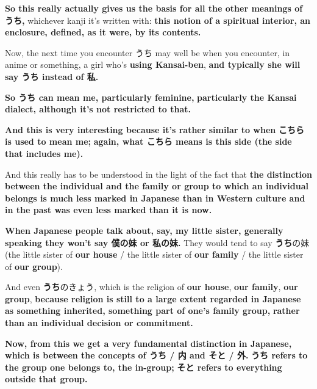 {}

{\bf So this really actually gives us the basis for all the other meanings of うち,} whichever kanji it's written with: {\bf this notion of a spiritual interior, an enclosure, defined, as it were, by its contents.}

\startsectionlevel[title={うち as meaning me / 私 etc.},reference={うち-as-meaning-me-私-etc.}]

Now, the next time you encounter うち may well be when you encounter, in anime or something, a girl who's {\bf using Kansai-ben}, {\bf and typically she will say うち instead of 私.}

{}

{\bf So うち can mean me, particularly feminine,} {\bf particularly the Kansai dialect, although it's not restricted to that.}

\thinrule

{\bf And this is very interesting because it's rather similar to when} {\bf こちら is used to mean me;} {\bf again, what こちら means is this side (the side that includes me).}

And this really has to be understood in the light of the fact that {\bf the distinction between the individual and the family or group to which an individual belongs is much less marked in Japanese than in Western culture and in the past was even less marked than it is now.}

\thinrule

{\bf When Japanese people talk about, say, my little sister, generally speaking they won't say 僕の妹 or 私の妹.} They would tend to say {\bf うち}の妹 (the little sister of {\bf our house} / the little sister of {\bf our family} / the little sister of {\bf our group}).

{}

And even {\bf うち}のきょう, which is the religion of {\bf our house}, {\bf our family}, {\bf our group}, {\bf because religion is still to a large extent regarded in Japanese as something inherited, something part of one's family group,} {\bf rather than an individual decision or commitment.}

\stopsectionlevel

\startsectionlevel[title={うち vs そと},reference={うち-vs-そと}]

{\bf Now, from this we get a very fundamental distinction in Japanese,} {\bf which is between the concepts of うち / 内 and そと / 外.} {\bf うち refers to the group one belongs to, the in-group;} {\bf そと refers to everything outside that group.}

